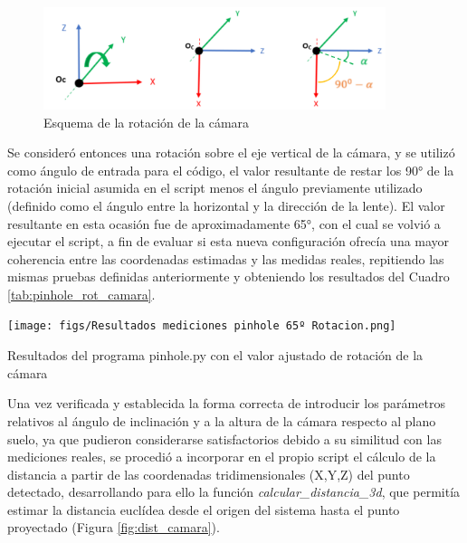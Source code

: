   \begin{figure}[H]
     \centering
     \begin{center}
       \includegraphics[width=100mm]{figs/Esquema rotación cámara.png}
     \end{center}
     \caption{Esquema de la rotación de la cámara}
    \label{fig:esquema_rot_camara}
  \end{figure}

Se consideró entonces una rotación sobre el eje vertical de la cámara, y se utilizó como ángulo de entrada para el código, el valor resultante de restar los 90° de la rotación inicial asumida en el script menos el ángulo previamente utilizado (definido como el ángulo entre la horizontal y la dirección de la lente). El valor resultante en esta ocasión fue de aproximadamente 65°, con el cual se volvió a ejecutar el script, a fin de evaluar si esta nueva configuración ofrecía una mayor coherencia entre las coordenadas estimadas y las medidas reales, repitiendo las mismas pruebas definidas anteriormente y obteniendo los resultados del Cuadro \ref{tab:pinhole_rot_camara}.

   \begin{table}[H]
   \centering
   \begin{center}
     \texttt{[image: figs/Resultados mediciones pinhole 65º Rotacion.png]}
   \end{center}
   \caption{Resultados del programa pinhole.py con el valor ajustado de rotación de la cámara}
   \label{tab:pinhole_rot_camara}
  \end{table}
  
Una vez verificada y establecida la forma correcta de introducir los parámetros relativos al ángulo de inclinación y a la altura de la cámara respecto al plano suelo, ya que pudieron considerarse satisfactorios debido a su similitud con las mediciones reales, se procedió a incorporar en el propio script el cálculo de la distancia a partir de las coordenadas tridimensionales (X,Y,Z) del punto detectado, desarrollando para ello la función \textit{calcular\_distancia\_3d}, que permitía estimar la distancia euclídea desde el origen del sistema hasta el punto proyectado (Figura \ref{fig:dist_camara}). 

